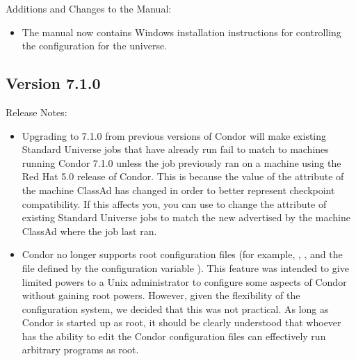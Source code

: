 \noindent Additions and Changes to the Manual:

\begin{itemize}

\item The manual now contains Windows installation instructions for
  controlling the configuration for the  universe.

\end{itemize}



\subsection*{\label{sec:New-7-1-0}Version 7.1.0}

\noindent Release Notes:

\begin{itemize}

\item Upgrading to 7.1.0 from previous versions of Condor will make
existing Standard Universe jobs that have already run fail to match to
machines running Condor 7.1.0 unless the job previously ran on a
machine using the Red Hat 5.0 release of Condor.  This is because the
value of the  attribute of the machine
ClassAd has changed in order to better represent checkpoint
compatibility.  If this affects you, you can use  to
change the  attribute of existing
Standard Universe jobs to match the new 
advertised by the machine ClassAd where the job last ran.

\item Condor no longer supports root configuration files
(for example, ,
, and
the file defined by the configuration variable
).  This feature was intended to
give limited powers to a Unix administrator to configure some aspects
of Condor without gaining root powers.  However, given the flexibility
of the configuration system, we decided that this was not practical.
As long as Condor is started up as root, it should be clearly
understood that whoever has the ability to edit the Condor
configuration files can effectively run arbitrary programs as root.

\end{itemize}


